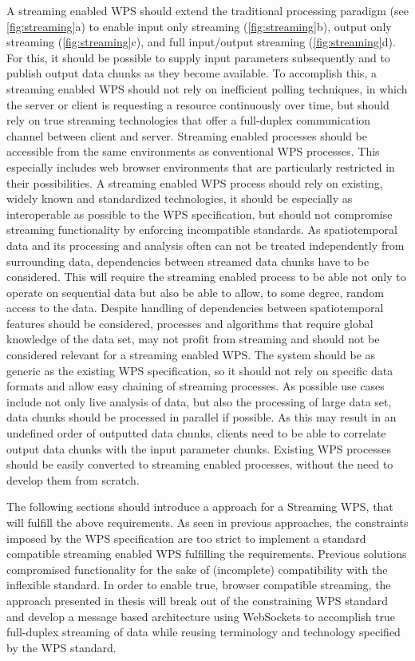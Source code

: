   A streaming enabled \ac{WPS} should extend the traditional processing paradigm (see \cref{fig:streaming}a) to enable input only streaming (\cref{fig:streaming}b), output only streaming (\cref{fig:streaming}c), and full input/output streaming (\cref{fig:streaming}d). For this, it should be possible to supply input parameters subsequently and to publish output data chunks as they become available. To accomplish this, a streaming enabled \ac{WPS} should not rely on inefficient polling techniques, in which the server or client is requesting a resource continuously over time, but should rely on true streaming technologies that offer a full-duplex communication channel between client and server. Streaming enabled processes should be accessible from the same environments as conventional \ac{WPS} processes. This especially includes web browser environments that are particularly restricted in their possibilities. A streaming enabled \ac{WPS} process should rely on existing, widely known and standardized technologies, it should be especially as interoperable as possible to the \ac{WPS} specification, but should not compromise streaming functionality by enforcing incompatible standards. As spatiotemporal data and its processing and analysis often can not be treated independently from surrounding data, dependencies between streamed data chunks have to be considered. This will require the streaming enabled process to be able not only to operate on sequential data but also be able to allow, to some degree, random access to the data. Despite handling of dependencies between spatiotemporal features should be considered, processes and algorithms that require global knowledge of the data set, may not profit from streaming and should not be considered relevant for a streaming enabled \ac{WPS}. The system should be as generic as the existing \ac{WPS} specification, so it should not rely on specific data formats and allow easy chaining of streaming processes. As possible use cases include not only live analysis of data, but also the processing of large data set, data chunks should be processed in parallel if possible. As this may result in an undefined order of outputted data chunks, clients need to be able to correlate output data chunks with the input parameter chunks. Existing \ac{WPS} processes should be easily converted to streaming enabled processes, without the need to develop them from scratch.

  The following sections should introduce a approach for a Streaming \ac{WPS}, that will fulfill the above requirements. As seen in previous approaches, the constraints imposed by the \ac{WPS} specification are too strict to implement a standard compatible streaming enabled WPS fulfilling the requirements. Previous solutions compromised functionality for the sake of (incomplete) compatibility with the inflexible standard. In order to enable true, browser compatible streaming, the approach presented in thesis will break out of the constraining \ac{WPS} standard and develop a message based architecture using WebSockets to accomplish true full-duplex streaming of data while reusing terminology and technology specified by the \ac{WPS} standard.

